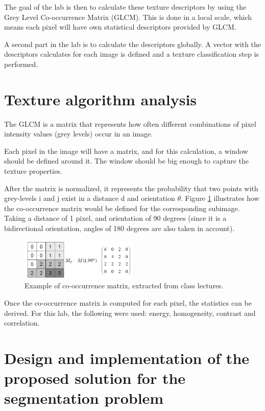 \documentclass{article}
\begin{document}
The goal of the lab is then to calculate these texture descriptors by using the Grey Level Co-occurrence Matrix (GLCM). This is done in a local scale, which means each pixel will have own statistical descriptors provided by GLCM.

A second part in the lab is to calculate the descriptors globally. A vector with the descriptors calculates for each image is defined and a texture classification step is performed.

\section{Texture algorithm analysis}


The GLCM is a matrix that represents how often different combinations of pixel intensity values (grey levels) occur in an image.

Each pixel in the image will have a matrix, and for this calculation, a window  should be defined around it. The window should be big enough to capture the texture properties.

After the matrix is normalized, it represents the probability that two points with grey-levels i and j exist in a distance d and orientation $\theta$. Figure \ref{fig:coc} illustrates how the co-occurrence matrix would be defined for the corresponding subimage. Taking a distance of 1 pixel, and orientation of 90 degrees (since it is a bidirectional orientation, angles of 180 degrees are also taken in account).

\begin{figure}[h!]
  \centering
    \includegraphics[width=0.5\textwidth]{coc}
    \caption{Example of co-occurrence matrix, extracted from class lectures.}
    \label{fig:coc}
\end{figure}

Once the co-occurrence matrix is computed for each pixel, the statistics can be derived. For this lab, the following were used: energy, homogeneity, contrast and correlation.


\section{Design and implementation of the proposed solution for the segmentation problem}
\end{document}
